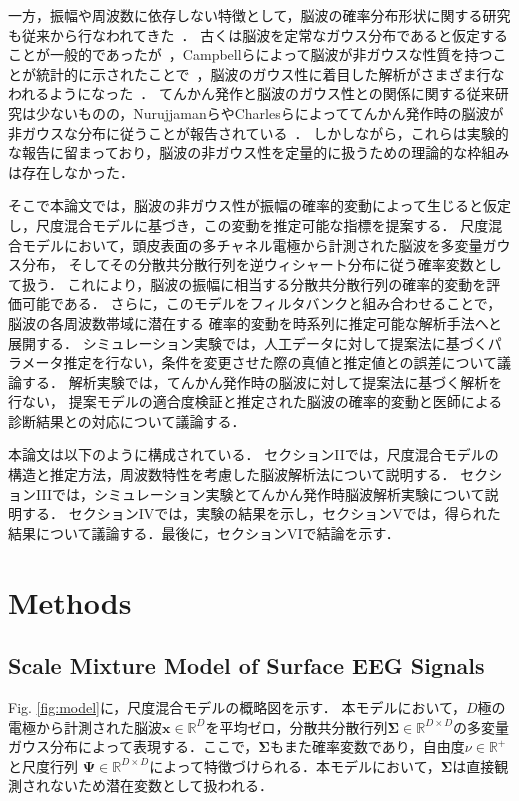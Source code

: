 \documentclass[journal]{IEEEtran}
\begin{document}
一方，振幅や周波数に依存しない特徴として，脳波の確率分布形状に関する研究も従来から行なわれてきた~\cite{Sounders1963,Gonen2012,Campbell1967,Weiss1973,Nurujjaman2009,Charles1999}．
古くは脳波を定常なガウス分布であると仮定することが一般的であったが~\cite{Sounders1963,Gonen2012}，Campbellらによって脳波が非ガウスな性質を持つことが統計的に示されたことで~\cite{Campbell1967}，脳波のガウス性に着目した解析がさまざま行なわれるようになった~\cite{Gonen2012,Weiss1973,Nurujjaman2009,Charles1999}．
てんかん発作と脳波のガウス性との関係に関する従来研究は少ないものの，NurujjamanらやCharlesらによっててんかん発作時の脳波が非ガウスな分布に従うことが報告されている~\cite{Nurujjaman2009,Charles1999}．
しかしながら，これらは実験的な報告に留まっており，脳波の非ガウス性を定量的に扱うための理論的な枠組みは存在しなかった．

そこで本論文では，脳波の非ガウス性が振幅の確率的変動によって生じると仮定し，尺度混合モデルに基づき，この変動を推定可能な指標を提案する．
尺度混合モデルにおいて，頭皮表面の多チャネル電極から計測された脳波を多変量ガウス分布，
そしてその分散共分散行列を逆ウィシャート分布に従う確率変数として扱う．
これにより，脳波の振幅に相当する分散共分散行列の確率的変動を評価可能である．
さらに，このモデルをフィルタバンクと組み合わせることで，脳波の各周波数帯域に潜在する
確率的変動を時系列に推定可能な解析手法へと展開する．
シミュレーション実験では，人工データに対して提案法に基づくパラメータ推定を行ない，条件を変更させた際の真値と推定値との誤差について議論する．
解析実験では，てんかん発作時の脳波に対して提案法に基づく解析を行ない，
提案モデルの適合度検証と推定された脳波の確率的変動と医師による診断結果との対応について議論する．

本論文は以下のように構成されている．
セクションIIでは，尺度混合モデルの構造と推定方法，周波数特性を考慮した脳波解析法について説明する．
セクションIIIでは，シミュレーション実験とてんかん発作時脳波解析実験について説明する．
セクションIVでは，実験の結果を示し，セクションVでは，得られた結果について議論する．最後に，セクションVIで結論を示す．

\section{Methods}

\subsection{Scale Mixture Model of Surface EEG Signals}
Fig. \ref{fig:model}に，尺度混合モデルの概略図を示す．
本モデルにおいて，$D$極の電極から計測された脳波$\mathbf{x} \in \mathbb{R}^{D}$を平均ゼロ，分散共分散行列$\bm {\Sigma} \in \mathbb{R}^{D \times D}$の多変量ガウス分布によって表現する．ここで，$\bm {\Sigma}$もまた確率変数であり，自由度$\nu \in \mathbb{R}^+$ と尺度行列 ${\bm \Psi} \in \mathbb{R}^{D \times D}$によって特徴づけられる．本モデルにおいて，$\bm \Sigma$は直接観測されないため潜在変数として扱われる．
\end{document}
